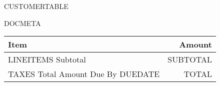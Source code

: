 \documentclass{simple}
\begin{document}
\customertable
{{{CUSTOMERTABLE}}}


\gsdocmeta
{{{DOCMETA}}}
    
\gsfixedwidth
\begin{longtable}{|p{460pt}|r|}
\hline
\bf Item & \bf Amount \\
\hline\hline
{{{LINEITEMS}}}
\hline
Subtotal & {{{SUBTOTAL}}} \\
{{{TAXES}}}
\hline\hline
Total Amount Due By {{{DUEDATE}}} & {{{TOTAL}}} \\
\hline
\end{longtable}
\end{document}
